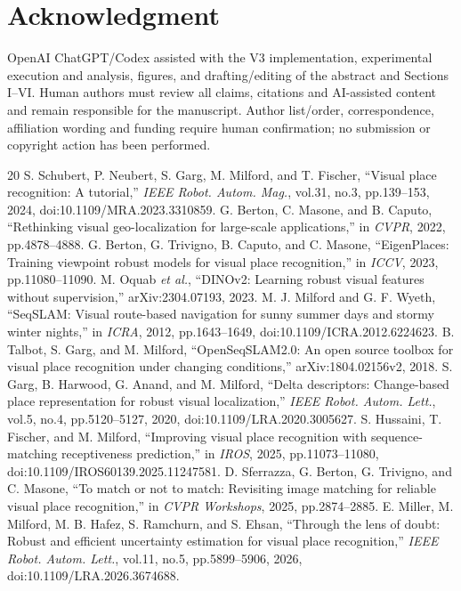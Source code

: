 \documentclass[conference]{IEEEtran}
\begin{document}
\section*{Acknowledgment}
OpenAI ChatGPT/Codex assisted with the V3 implementation, experimental execution and analysis, figures, and drafting/editing of the abstract and Sections I--VI. Human authors must review all claims, citations and AI-assisted content and remain responsible for the manuscript. Author list/order, correspondence, affiliation wording and funding require human confirmation; no submission or copyright action has been performed.

\clearpage
\begin{thebibliography}{20}
 S. Schubert, P. Neubert, S. Garg, M. Milford, and T. Fischer, ``Visual place recognition: A tutorial,'' \emph{IEEE Robot. Autom. Mag.}, vol.31, no.3, pp.139--153, 2024, doi:10.1109/MRA.2023.3310859.
 G. Berton, C. Masone, and B. Caputo, ``Rethinking visual geo-localization for large-scale applications,'' in \emph{CVPR}, 2022, pp.4878--4888.
 G. Berton, G. Trivigno, B. Caputo, and C. Masone, ``EigenPlaces: Training viewpoint robust models for visual place recognition,'' in \emph{ICCV}, 2023, pp.11080--11090.
 M. Oquab \emph{et al.}, ``DINOv2: Learning robust visual features without supervision,'' arXiv:2304.07193, 2023.
 M. J. Milford and G. F. Wyeth, ``SeqSLAM: Visual route-based navigation for sunny summer days and stormy winter nights,'' in \emph{ICRA}, 2012, pp.1643--1649, doi:10.1109/ICRA.2012.6224623.
 B. Talbot, S. Garg, and M. Milford, ``OpenSeqSLAM2.0: An open source toolbox for visual place recognition under changing conditions,'' arXiv:1804.02156v2, 2018.
 S. Garg, B. Harwood, G. Anand, and M. Milford, ``Delta descriptors: Change-based place representation for robust visual localization,'' \emph{IEEE Robot. Autom. Lett.}, vol.5, no.4, pp.5120--5127, 2020, doi:10.1109/LRA.2020.3005627.
 S. Hussaini, T. Fischer, and M. Milford, ``Improving visual place recognition with sequence-matching receptiveness prediction,'' in \emph{IROS}, 2025, pp.11073--11080, doi:10.1109/IROS60139.2025.11247581.
 D. Sferrazza, G. Berton, G. Trivigno, and C. Masone, ``To match or not to match: Revisiting image matching for reliable visual place recognition,'' in \emph{CVPR Workshops}, 2025, pp.2874--2885.
 E. Miller, M. Milford, M. B. Hafez, S. Ramchurn, and S. Ehsan, ``Through the lens of doubt: Robust and efficient uncertainty estimation for visual place recognition,'' \emph{IEEE Robot. Autom. Lett.}, vol.11, no.5, pp.5899--5906, 2026, doi:10.1109/LRA.2026.3674688.

\end{thebibliography}
\end{document}
